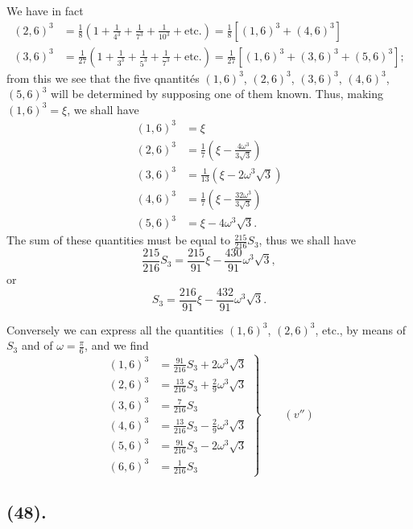 \documentclass{article}
\begin{document}
We have in fact
\[ \begin{aligned} (2,6)^{3}&=\frac{1}{8}\left(1+\frac{1}{4^{3}}+\frac{1}{7^{3}}+\frac{1}{10^{3}}+\text{etc.}\right)=\frac{1}{8}[(1,6)^{3}+(4,6)^{3}]\\ (3,6)^{3}&=\frac{1}{27}\left(1+\frac{1}{3^{3}}+\frac{1}{5^{3}}+\frac{1}{7^{3}}+\text{etc.}\right)=\frac{1}{27}[(1,6)^{3}+(3,6)^{3}+(5,6)^{3}]; \end{aligned} \]
from this we see that the five qnantités $(1,6)^{3}$, $(2,6)^{3}$, $(3,6)^{3}$, $(4,6)^{3}$, $(5,6)^{3}$ will be determined by supposing one of them known. Thus, making $(1,6)^{3}=\xi$, we shall have
\[ \begin{aligned} (1,6)^{3}&=\xi\\ (2,6)^{3}&=\frac{1}{7}\left(\xi-\frac{4\omega^{3}}{3\sqrt{3}}\right)\\ (3,6)^{3}&=\frac{1}{13}\left(\xi-2\omega^{3}\sqrt{3}\right)\\ (4,6)^{3}&=\frac{1}{7}\left(\xi-\frac{32\omega^{3}}{3\sqrt{3}}\right)\\ (5,6)^{3}&=\xi-4\omega^{3}\sqrt{3}. \end{aligned} \]
The sum of these quantities must be equal to $\frac{215}{216}S_{3}$, thus we shall have
\[ \frac{215}{216}S_{3}=\frac{215}{91}\xi-\frac{430}{91}\omega^{3}\sqrt{3}, \]
or
\[ S_{3}=\frac{216}{91}\xi-\frac{432}{91}\omega^{3}\sqrt{3}. \]


Conversely we can express all the quantities $(1,6)^{3}$, $(2,6)^{3}$, etc., by means of $S_{3}$ and of $\omega=\frac{\pi}{6}$, and we find
\[ \left.\begin{aligned} (1,6)^{3}&=\frac{91}{216}S_{3}+2\omega^{3}\sqrt{3}\\ (2,6)^{3}&=\frac{13}{216}S_{3}+\frac{2}{9}\omega^{3}\sqrt{3}\\ (3,6)^{3}&=\frac{7}{216}S_{3}\\ (4,6)^{3}&=\frac{13}{216}S_{3}-\frac{2}{9}\omega^{3}\sqrt{3}\\ (5,6)^{3}&=\frac{91}{216}S_{3}-2\omega^{3}\sqrt{3}\\ (6,6)^{3}&=\frac{1}{216}S_{3} \end{aligned}\right\}\qquad(v'') \]

\subsection*{(48).}
\end{document}
